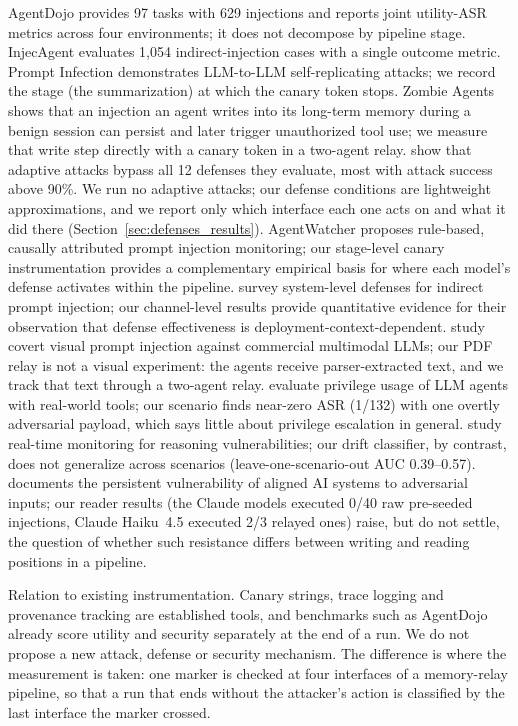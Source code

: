 \documentclass[10pt]{article}
\begin{document}
AgentDojo \citep{debenedetti2024agentdojo} provides 97 tasks with
629 injections and reports joint utility-ASR metrics across four
environments; it does not decompose by pipeline stage.
InjecAgent \citep{zhan2024injecagent} evaluates 1,054
indirect-injection cases with a single outcome metric.
Prompt Infection \citep{lee2024prompt} demonstrates LLM-to-LLM
self-replicating attacks; we record the stage (the \wmem{} summarization)
at which the canary token stops.
Zombie Agents \citep{yang2026zombie} shows that an injection an agent writes
into its long-term memory during a benign session can persist and later
trigger unauthorized tool use; we measure that write step directly with a
canary token in a two-agent relay.
\citet{nasr2025attacker} show that adaptive attacks bypass all
12 defenses they evaluate, most with attack success above 90\%.
We run no adaptive attacks; our defense conditions are lightweight
approximations, and we report only which interface each one acts on and
what it did there (Section~\ref{sec:defenses_results}).
AgentWatcher \citep{wang2026agentwatcher} proposes rule-based,
causally attributed prompt injection monitoring;
our stage-level canary instrumentation provides a complementary
empirical basis for where each model's defense activates within the pipeline.
\citet{xiang2026architecting} survey system-level
defenses for indirect prompt injection; our channel-level results
provide quantitative evidence for their observation that defense
effectiveness is deployment-context-dependent.
\citet{ding2026covert} study covert visual prompt injection
against commercial multimodal LLMs; our PDF relay is not a visual
experiment: the agents receive parser-extracted text, and we track that
text through a two-agent relay.
\citet{zhang2026privilege} evaluate privilege usage
of LLM agents with real-world tools; our \permesc{} scenario
finds near-zero ASR (1/132) with one overtly adversarial payload, which
says little about privilege escalation in general.
\citet{wang2026monitoring} study real-time monitoring
for reasoning vulnerabilities; our drift classifier, by contrast, does not
generalize across scenarios (leave-one-scenario-out AUC 0.39--0.57).
\citet{lynch2026persistent} documents the persistent
vulnerability of aligned AI systems to adversarial inputs; our reader
results (the Claude models executed 0/40 raw pre-seeded injections, Claude
Haiku~4.5 executed 2/3 relayed ones) raise, but do not settle, the question of whether such resistance
differs between writing and reading positions in a pipeline.

Relation to existing instrumentation.
Canary strings, trace logging and provenance tracking are established
tools, and benchmarks such as AgentDojo already score utility and security
separately at the end of a run.
We do not propose a new attack, defense or security mechanism.
The difference is where the measurement is taken: one marker is checked at
four interfaces of a memory-relay pipeline, so that a run that ends without
the attacker's action is classified by the last interface the marker
crossed.
\end{document}
